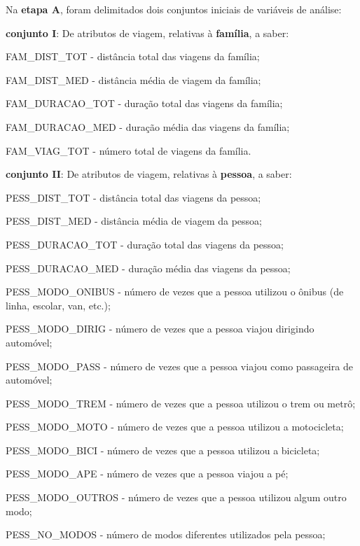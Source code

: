 \newpage
Na \textbf{etapa A}, foram delimitados dois conjuntos iniciais de variáveis de análise:
\label{conjuntos-variaveis}
\begin{compactitem}
\item \textbf{conjunto I}: De atributos de viagem, relativas à \textbf{família}, a saber: 
\begin{compactitem}[]
\item FAM_DIST_TOT - distância total das viagens da família;
\item FAM_DIST_MED - distância média de viagem da família;
\item FAM_DURACAO_TOT - duração total das viagens da família;
\item FAM_DURACAO_MED - duração média das viagens da família;
\item FAM_VIAG_TOT - número total de viagens da família.
\end{compactitem}
\item \textbf{conjunto II}: De atributos de viagem, relativas à \textbf{pessoa}, a saber: 
\begin{compactitem}[]
\item PESS_DIST_TOT - distância total das viagens da pessoa;
\item PESS_DIST_MED - distância média de viagem da pessoa;
\item PESS_DURACAO_TOT - duração total das viagens da pessoa;
\item PESS_DURACAO_MED - duração média das viagens da pessoa;
\item PESS_MODO_ONIBUS - número de vezes que a pessoa utilizou o ônibus (de linha, escolar, van, etc.);
\item PESS_MODO_DIRIG - número de vezes que a pessoa viajou dirigindo automóvel;
\item PESS_MODO_PASS - número de vezes que a pessoa viajou como passageira de automóvel;
\item PESS_MODO_TREM - número de vezes que a pessoa utilizou o trem ou metrô;
\item PESS_MODO_MOTO - número de vezes que a pessoa utilizou a motocicleta;
\item PESS_MODO_BICI - número de vezes que a pessoa utilizou a bicicleta;
\item PESS_MODO_APE - número de vezes que a pessoa viajou a pé;
\item PESS_MODO_OUTROS - número de vezes que a pessoa utilizou algum outro modo;
\item PESS_NO_MODOS - número de modos diferentes utilizados pela pessoa;

\end{compactitem}
\end{compactitem}
